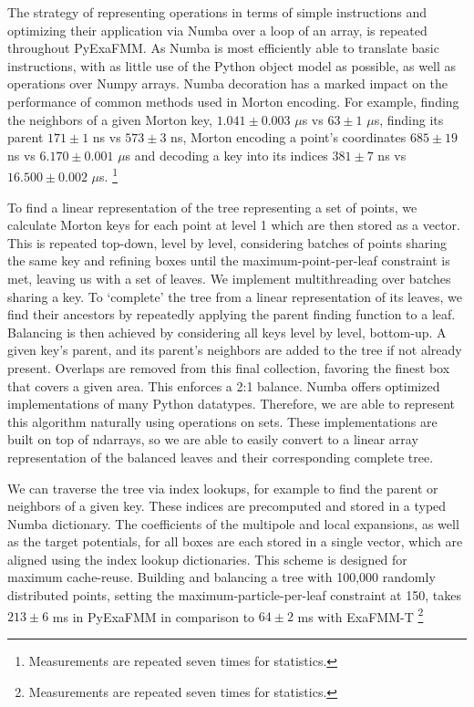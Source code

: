 \documentclass{IEEEcsmag}
\begin{document}
The strategy of representing operations in terms of simple instructions and optimizing their application via Numba over a loop of an array, is repeated throughout PyExaFMM. As Numba is most efficiently able to translate basic instructions, with as little use of the Python object model as possible, as well as operations over Numpy arrays. Numba decoration has a marked impact on the performance of common methods used in Morton encoding. For example, finding the neighbors of a given Morton key, $1.041 \pm 0.003$ $\mu$s vs  $63 \pm 1$ $\mu$s, finding its parent $171 \pm 1$ ns vs $573 \pm 3$ ns, Morton encoding a point's coordinates $685 \pm 19$ ns vs $6.170 \pm 0.001$ $\mu$s and decoding a key into its indices $381 \pm 7$ ns vs $16.500 \pm 0.002$ $\mu$s. \footnote[3]{Measurements are repeated seven times for statistics.}

To find a linear representation of the tree representing a set of points, we calculate Morton keys for each point at level 1 which are then stored as a vector. This is repeated top-down, level by level, considering batches of points sharing the same key and refining boxes until the maximum-point-per-leaf constraint is met, leaving us with a set of leaves. We implement multithreading over batches sharing a key. To `complete' the tree from a linear representation of its leaves, we find their ancestors by repeatedly applying the parent finding function to a leaf. Balancing is then achieved by considering all keys level by level, bottom-up. A given key's parent, and its parent's neighbors are added to the tree if not already present. Overlaps are removed from this final collection, favoring the finest box that covers a given area. This enforces a 2:1 balance. Numba offers optimized implementations of many Python datatypes. Therefore, we are able to represent this algorithm naturally using operations on sets. These implementations are built on top of ndarrays, so we are able to easily convert to a linear array representation of the balanced leaves and their corresponding complete tree.

We can traverse the tree via index lookups, for example to find the parent or neighbors of a given key. These indices are precomputed and stored in a typed Numba dictionary. The coefficients of the multipole and local expansions, as well as the target potentials, for all boxes are each stored in a single vector, which are aligned using the index lookup dictionaries. This scheme is designed for maximum cache-reuse.
Building and balancing a tree with 100,000 randomly distributed points, setting the maximum-particle-per-leaf constraint at 150, takes $213 \pm 6$ ms in PyExaFMM in comparison to $64 \pm 2$ ms with ExaFMM-T \footnote[4]{Measurements are repeated seven times for statistics.}
\end{document}
